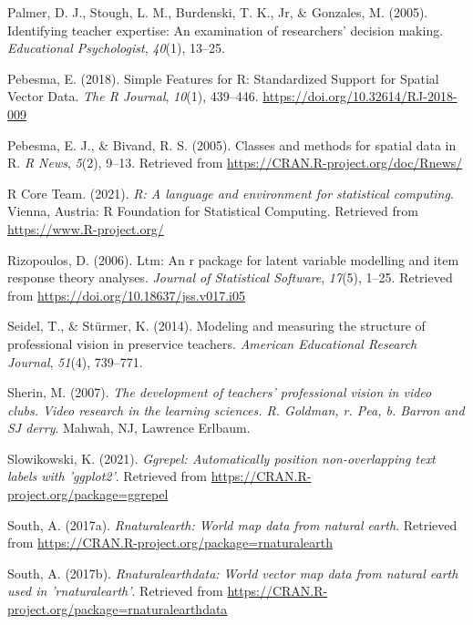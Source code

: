 \documentclass[
  man,floatsintext]{apa6}
\newlength{\cslhangindent}
\newlength{\cslentryspacingunit} %
\newenvironment{CSLReferences}[2] %
 {%
  \setlength{\parindent}{0pt}
  \ifodd #1
  \let\oldpar\par
  \def\par{\hangindent=\cslhangindent\oldpar}
  \fi
  \setlength{\parskip}{#2\cslentryspacingunit}
 }%
 {}
\begin{document}
\begin{CSLReferences}{1}{0}
\leavevmode{}%
Palmer, D. J., Stough, L. M., Burdenski, T. K., Jr, \& Gonzales, M. (2005). Identifying teacher expertise: An examination of researchers' decision making. \emph{Educational Psychologist}, \emph{40}(1), 13--25.

\leavevmode{}%
Pebesma, E. (2018). {Simple Features for R: Standardized Support for Spatial Vector Data}. \emph{{The R Journal}}, \emph{10}(1), 439--446. \url{https://doi.org/10.32614/RJ-2018-009}

\leavevmode{}%
Pebesma, E. J., \& Bivand, R. S. (2005). Classes and methods for spatial data in {R}. \emph{R News}, \emph{5}(2), 9--13. Retrieved from \url{https://CRAN.R-project.org/doc/Rnews/}

\leavevmode{}%
R Core Team. (2021). \emph{R: A language and environment for statistical computing}. Vienna, Austria: R Foundation for Statistical Computing. Retrieved from \url{https://www.R-project.org/}

\leavevmode{}%
Rizopoulos, D. (2006). Ltm: An r package for latent variable modelling and item response theory analyses. \emph{Journal of Statistical Software}, \emph{17}(5), 1--25. Retrieved from \url{https://doi.org/10.18637/jss.v017.i05}

\leavevmode{}%
Seidel, T., \& Stürmer, K. (2014). Modeling and measuring the structure of professional vision in preservice teachers. \emph{American Educational Research Journal}, \emph{51}(4), 739--771.

\leavevmode{}%
Sherin, M. (2007). \emph{The development of teachers' professional vision in video clubs. Video research in the learning sciences. R. Goldman, r. Pea, b. Barron and SJ derry}. Mahwah, NJ, Lawrence Erlbaum.

\leavevmode{}%
Slowikowski, K. (2021). \emph{Ggrepel: Automatically position non-overlapping text labels with 'ggplot2'}. Retrieved from \url{https://CRAN.R-project.org/package=ggrepel}

\leavevmode{}%
South, A. (2017a). \emph{Rnaturalearth: World map data from natural earth}. Retrieved from \url{https://CRAN.R-project.org/package=rnaturalearth}

\leavevmode{}%
South, A. (2017b). \emph{Rnaturalearthdata: World vector map data from natural earth used in 'rnaturalearth'}. Retrieved from \url{https://CRAN.R-project.org/package=rnaturalearthdata}


\end{CSLReferences}
\end{document}
